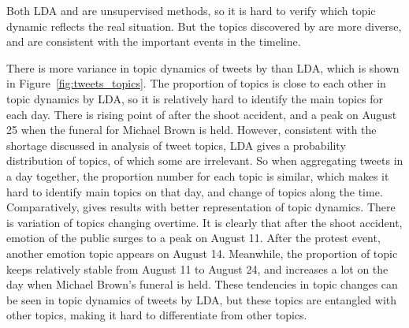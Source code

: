 Both LDA and \stlda are unsupervised methods, so it is hard to verify which topic dynamic reflects the real situation. But the topics discovered by \stlda are more diverse, and are consistent with the important events in the timeline.

There is more variance in topic dynamics of tweets by \stlda than LDA, which is shown in Figure~\ref{fig:tweets_topics}. The proportion of topics is close to each other in topic dynamics by LDA, so it is relatively hard to identify the main topics for each day. There is rising point of \michaelbrown after the shoot accident, and a peak on August 25 when the funeral for Michael Brown is held. However, consistent with the shortage discussed in analysis of tweet topics, LDA gives a probability distribution of topics, of which some are irrelevant. So when aggregating tweets in a day together, the proportion number for each topic is similar, which makes it hard to identify main topics on that day, and change of topics along the time. Comparatively, \stlda gives results with better representation of topic dynamics. There is variation of topics changing overtime. It is clearly that after the shoot accident, emotion of the public surges to a peak on August 11. After the protest event, another emotion topic appears on August 14. Meanwhile, the proportion of \pray topic keeps relatively stable from August 11 to August 24, and increases a lot on the day when Michael Brown's funeral is held. These tendencies in topic changes can be seen in topic dynamics of tweets by LDA, but these topics are entangled with other topics, making it hard to differentiate from other topics.


